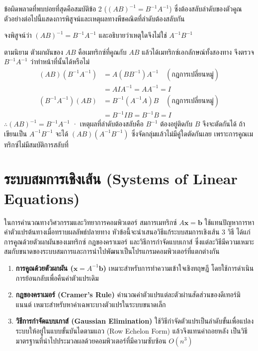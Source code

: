 ข้อผิดพลาดที่พบบ่อยที่สุดคือสมบัติข้อ 2 ($(AB)^{-1} = B^{-1}A^{-1}$) ซึ่งต้องสลับลำดับของตัวคูณ ตัวอย่างต่อไปนี้แสดงการพิสูจน์และเหตุผลทางพีชคณิตที่ลำดับต้องสลับกัน

\begin{ex}
\label{ex:inverse-of-product}
จงพิสูจน์ว่า $(AB)^{-1} = B^{-1} A^{-1}$ และอธิบายว่าเหตุใดจึงไม่ใช่ $A^{-1} B^{-1}$
\end{ex}
\begin{solution}
ตามนิยาม ตัวผกผันของ $AB$ คือเมทริกซ์ที่คูณกับ $AB$ แล้วได้เมทริกซ์เอกลักษณ์ทั้งสองทาง จึงตรวจ $B^{-1}A^{-1}$ ว่าทำหน้าที่นั้นได้หรือไม่
\begin{align*}
(AB)(B^{-1}A^{-1}) &= A(BB^{-1})A^{-1} \quad (\text{กฎการเปลี่ยนหมู่})\\
                   &= AIA^{-1} = AA^{-1} = I\\
(B^{-1}A^{-1})(AB) &= B^{-1}(A^{-1}A)B \quad (\text{กฎการเปลี่ยนหมู่})\\
                   &= B^{-1}IB = B^{-1}B = I
\end{align*}
$\therefore (AB)^{-1} = B^{-1}A^{-1}$ · เหตุผลที่ลำดับต้องสลับคือ $B^{-1}$ ต้องอยู่ติดกับ $B$ จึงจะตัดกันได้ ถ้าเขียนเป็น $A^{-1}B^{-1}$ จะได้ $(AB)(A^{-1}B^{-1})$ ซึ่งจัดกลุ่มแล้วไม่มีคู่ใดตัดกันเลย เพราะการคูณเมทริกซ์ไม่มีสมบัติการสลับที่ \solhere
\end{solution}

\section{ระบบสมการเชิงเส้น (Systems of Linear Equations)}
\label{sec:linear-systems}

ในการคำนวณทางวิศวกรรมและวิทยาการคอมพิวเตอร์ สมการเมทริกซ์ $A\mathbf{x} = \mathbf{b}$ ใช้แทนปัญหาการหาค่าตัวแปรต้นทางเมื่อทราบผลลัพธ์ปลายทาง หัวข้อนี้จะนำเสนอวิธีแก้ระบบสมการเชิงเส้น 3 วิธี ได้แก่ การคูณด้วยตัวผกผันของเมทริกซ์ กฎของคราเมอร์ และวิธีการกำจัดแบบเกาส์ ซึ่งแต่ละวิธีมีความเหมาะสมกับขนาดของระบบสมการและการนำไปพัฒนาเป็นโปรแกรมคอมพิวเตอร์ที่แตกต่างกัน~\parencite{lipschutz2009discrete}
\begin{enumerate}[label=\textbf{\arabic*.}]
    \item \textbf{การคูณด้วยตัวผกผัน ($\mathbf{x} = A^{-1}\mathbf{b}$)} เหมาะสำหรับการทำความเข้าใจเชิงทฤษฎี โดยใช้การดำเนินการย้อนกลับเพื่อคืนค่าตัวแปรเดิม
    \item \textbf{กฎของคราเมอร์ (Cramer's Rule)} คำนวณค่าตัวแปรแต่ละตัวผ่านสัดส่วนของดีเทอร์มิแนนต์ เหมาะสำหรับหาค่าเฉพาะบางตัวแปรในระบบขนาดเล็ก
    \item \textbf{วิธีการกำจัดแบบเกาส์ (Gaussian Elimination)} ใช้วิธีกำจัดตัวแปรเป็นลำดับขั้นเพื่อแปลงระบบให้อยู่ในแบบขั้นบันไดตามแถว (Row Echelon Form) แล้วจึงแทนค่าถอยหลัง เป็นวิธีมาตรฐานที่นำไปประมวลผลด้วยคอมพิวเตอร์ที่มีความซับซ้อน $O(n^3)$
\end{enumerate}

